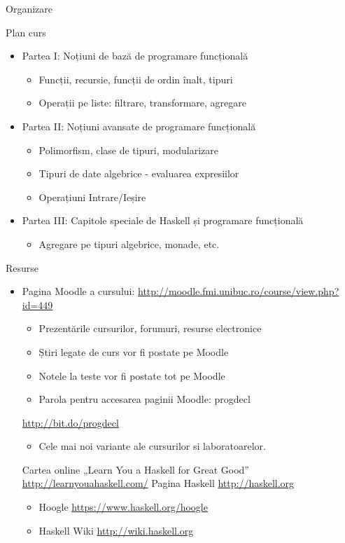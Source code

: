 \documentclass[xcolor=pdftex,romanian,colorlinks]{beamer}
\begin{document}
\begin{section}{Organizare}
\begin{frame}{Plan curs}
\begin{itemize}
\item Partea I: Noțiuni de bază de programare funcțională
\begin{itemize}
\item Funcții, recursie, funcții de ordin înalt, tipuri
\item Operații pe liste: filtrare, transformare, agregare
\end{itemize}
\item Partea II: Noțiuni avansate de programare funcțională
\begin{itemize}
\item Polimorfism, clase de tipuri, modularizare
\item Tipuri de date algebrice - evaluarea expresiilor
\item Operațiuni Intrare/Ieșire
\end{itemize}
\item Partea III: Capitole speciale de Haskell și programare funcțională
\begin{itemize}
\item Agregare pe tipuri algebrice, monade, etc.
\end{itemize}
\end{itemize}
\end{frame}

\begin{frame}{Resurse}
\begin{itemize}
\item Pagina Moodle a cursului: \url{http://moodle.fmi.unibuc.ro/course/view.php?id=449}
\begin{itemize}
\item Prezentările cursurilor, forumuri, resurse electronice
\item Știri legate de curs vor fi postate pe Moodle
\item Notele la teste vor fi postate tot pe Moodle
\item Parola pentru accesarea paginii Moodle: progdecl
\end{itemize}
\vitem \url{http://bit.do/progdecl}
\begin{itemize}
\item Cele mai noi variante ale cursurilor si laboratoarelor.
\end{itemize}
\vitem Cartea online „Learn You a Haskell for Great Good” \url{http://learnyouahaskell.com/}
\vitem Pagina Haskell \url{http://haskell.org}
\begin{itemize}
\item Hoogle \url{https://www.haskell.org/hoogle}
\item Haskell Wiki \url{http://wiki.haskell.org}
\end{itemize}
\end{itemize}
\end{frame}



\end{section}
\end{document}
